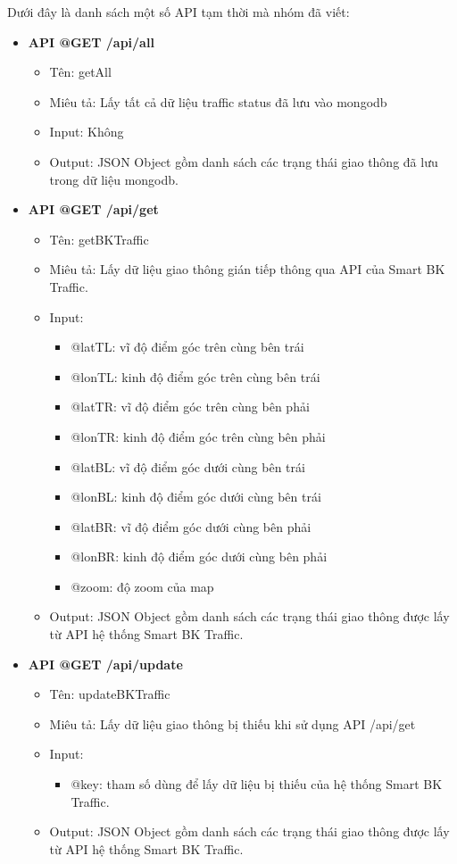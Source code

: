 Dưới đây là danh sách một số API tạm thời mà nhóm đã viết:
\begin{itemize}
    \item \textbf{API @GET /api/all}
    \begin{itemize}
        \item Tên: getAll
        \item Miêu tả: Lấy tất cả dữ liệu traffic status đã lưu vào mongodb
        \item Input: Không
        \item Output: JSON Object gồm danh sách các trạng thái giao thông đã lưu trong dữ liệu mongodb.
    \end{itemize}
    
    \item \textbf{API @GET /api/get}
    \begin{itemize}
        \item Tên: getBKTraffic
        \item Miêu tả: Lấy dữ liệu giao thông gián tiếp thông qua API của Smart BK Traffic. 
        \item Input:
        \begin{itemize}
            \item @latTL: vĩ độ điểm góc trên cùng bên trái
            \item @lonTL: kinh độ điểm góc trên cùng bên trái
            \item @latTR: vĩ độ điểm góc trên cùng bên phải 
            \item @lonTR: kinh độ điểm góc trên cùng bên phải
            \item @latBL: vĩ độ điểm góc dưới cùng bên trái
            \item @lonBL: kinh độ điểm góc dưới cùng bên trái
            \item @latBR: vĩ độ điểm góc dưới cùng bên phải
            \item @lonBR: kinh độ điểm góc dưới cùng bên phải 
            \item @zoom: độ zoom của map
        \end{itemize}
        \item Output: JSON Object gồm danh sách các trạng thái giao thông được lấy từ API hệ thống Smart BK Traffic.
    \end{itemize}
    
    \item \textbf{API @GET /api/update}
    \begin{itemize}
        \item Tên: updateBKTraffic
        \item Miêu tả: Lấy dữ liệu giao thông bị thiếu khi sử dụng API /api/get
        \item Input:
        \begin{itemize}
            \item @key: tham số dùng để lấy dữ liệu bị thiếu của hệ thống Smart BK Traffic.
        \end{itemize}
        \item Output: JSON Object gồm danh sách các trạng thái giao thông được lấy từ API hệ thống Smart BK Traffic.
    \end{itemize}
\end{itemize}